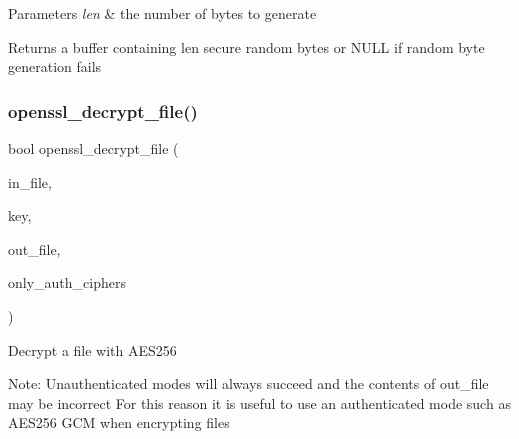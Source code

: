 \begin{DoxyParams}{Parameters}
{\em len} & the number of bytes to generate \\
\hline
\end{DoxyParams}
\begin{DoxyReturn}{Returns}
a buffer containing \textquotesingle{}len\textquotesingle{} secure random bytes or N\+U\+LL if random byte generation fails 
\end{DoxyReturn}
\mbox{\label{group__openssl__crypto_gaf1faa509e06c188acfbdf43e2197c61a}} 
\subsubsection{\texorpdfstring{openssl\+\_\+decrypt\+\_\+file()}{openssl\_decrypt\_file()}}
{\footnotesize\ttfamily bool openssl\+\_\+decrypt\+\_\+file (\begin{DoxyParamCaption}\item[{F\+I\+LE $\ast$}]{in\+\_\+file,  }\item[{const \mbox{\hyperlink{structwickr__cipher__key}{wickr\+\_\+cipher\+\_\+key\+\_\+t}} $\ast$}]{key,  }\item[{F\+I\+LE $\ast$}]{out\+\_\+file,  }\item[{bool}]{only\+\_\+auth\+\_\+ciphers }\end{DoxyParamCaption})}

Decrypt a file with A\+E\+S256

Note\+: Unauthenticated modes will always succeed and the contents of \textquotesingle{}out\+\_\+file\textquotesingle{} may be incorrect For this reason it is useful to use an authenticated mode such as A\+E\+S256 G\+CM when encrypting files


